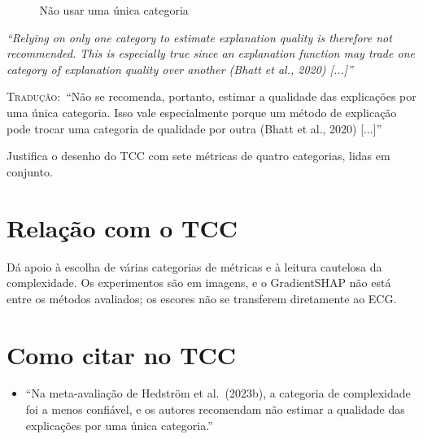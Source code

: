 \documentclass[11pt,a4paper]{article}
\newcommand{\pagechip}[1]{{\setlength{\fboxsep}{1.5pt}\colorbox{cAcc}{\textcolor{white}{\scriptsize\texttt{#1}}}}}
\newenvironment{origquote}{\par\itshape\small}{\par}
\newenvironment{tradquote}{\par\small\textsc{Tradução:}\ }{\par}
\newcommand{\explab}[1]{\par\smallskip{\small\color{cAcc}\textbf{\MakeUppercase{#1}}}\par}
\begin{document}
\begin{citacard}{\pagechip{p. 13} Não usar uma única categoria}
\begin{origquote}“Relying on only one category to estimate explanation quality is therefore not recommended. This is especially true since an explanation function may trade one category of explanation quality over another (Bhatt et al., 2020) [...]”\end{origquote}
\begin{tradquote}“Não se recomenda, portanto, estimar a qualidade das explicações por uma única categoria. Isso vale especialmente porque um método de explicação pode trocar uma categoria de qualidade por outra (Bhatt et al., 2020) [...]”\end{tradquote}
\explab{Explicação}
Justifica o desenho do TCC com sete métricas de quatro categorias, lidas em conjunto.
\end{citacard}

\section{Relação com o TCC}
Dá apoio à escolha de várias categorias de métricas e à leitura cautelosa da complexidade. Os experimentos são em imagens, e o GradientSHAP não está entre os métodos avaliados; os escores não se transferem diretamente ao ECG.

\section{Como citar no TCC}
\begin{itemize}
\item ``Na meta-avaliação de Hedström et al.\ (2023b), a categoria de complexidade foi a menos confiável, e os autores recomendam não estimar a qualidade das explicações por uma única categoria.''
\end{itemize}
\end{document}
